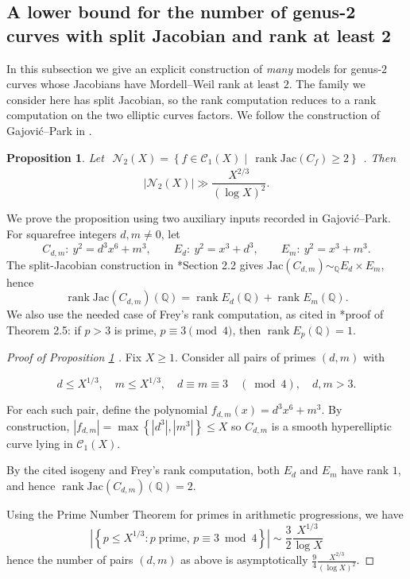 \documentclass{amsart}
\newcommand{\cC}{\mathcal{C}}
\newcommand{\Jac}{\mathrm{Jac}}
\DeclareMathOperator{\rank}{\mathrm{rank}}
\newtheorem{proposition}{Proposition}[section]
\begin{document}
\subsection{A lower bound for the number of genus-2 curves with split Jacobian and rank at least 2}\label{ssec:split}


In this subsection we give an explicit construction of {\it many} models for genus-$2$ curves whose Jacobians have Mordell--Weil rank at least $2$. The family we consider here has split Jacobian, so the rank computation reduces to a rank computation on the two elliptic curves factors. We follow the construction of Gajovi\'c--Park in  \cite{Gajovic2025}.


\begin{proposition}\label{prop:split} 
Let $
\begin{array}{l}
\mathcal{N}_{2}(X)=\left\{f \in \cC_1(X) \mid   \,  \rank \Jac\left(C_f\right) \geq 2\right\}
\end{array}
$. Then
$$
|\mathcal{N}_{2}(X)| \gg \frac{X^{2 / 3}}{(\log X)^2}.
$$  
\end{proposition}

We prove the proposition using two auxiliary inputs recorded in Gajovi\'c--Park. For
squarefree integers \(d,m\ne 0\), let
\[
C_{d,m}:\ y^2=d^3x^6+m^3,\qquad
E_d:\ y^2=x^3+d^3,\qquad E_m:\ y^2=x^3+m^3.
\]
The split-Jacobian construction in \cite{Gajovic2025}*{Section 2.2} gives
\(\Jac(C_{d,m})\sim_{\mathbb Q}E_d\times E_m\), hence
\[
\rank\Jac(C_{d,m})(\mathbb Q)=\rank E_d(\mathbb Q)+\rank E_m(\mathbb Q).
\]
We also use the needed case of Frey's rank computation, as cited in
\cite{Gajovic2025}*{proof of Theorem 2.5}: if \(p>3\) is prime,
\(p\equiv3\pmod 4\), then \(\rank E_p(\mathbb Q)=1\).

\begin{proof}[Proof of Proposition \ref{prop:split} ] Fix $X \geq 1$. Consider all pairs of primes $(d, m)$ with

$$
d \leq X^{1 / 3}, \quad m \leq X^{1 / 3}, \quad d \equiv m \equiv 3 \quad(\bmod 4), \quad d, m>3 .
$$


For each such pair, define the polynomial $f_{d, m}(x)=d^3 x^6+m^3$. By construction,  $\left|f_{d, m}\right|=\max \left\{\left|d^3\right|,\left|m^3\right|\right\} \leq X$ so $C_{d,m}$ is a smooth hyperelliptic curve lying in $\cC_1(X)$.

By the cited isogeny and Frey's rank computation, both \(E_d\) and \(E_m\)
have rank \(1\), and hence \(\rank \Jac(C_{d,m})(\mathbb Q)=2\).

Using the Prime Number Theorem for primes in arithmetic progressions, we have
$$\left|\left\{p \leq X^{1 / 3}: p\; \text{prime}, \, p \equiv 3 \bmod 4\right\}\right| \sim \frac{3}{2} \frac{X^{1 / 3}}{\log X}$$ 
hence the number of pairs $(d,m)$ as above is asymptotically $\frac{9}{4} \frac{X^{2 / 3}}{(\log X)^2}$. 
\end{proof}
\end{document}
